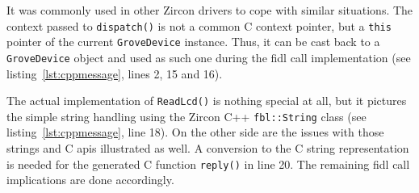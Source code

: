 It was commonly used in other Zircon drivers to cope with similar situations.
%
%
%
The context passed to \texttt{dispatch()} is not a common C context pointer, but a \texttt{this} pointer of the current \texttt{GroveDevice} instance.
Thus, it can be cast back to a \texttt{GroveDevice} object and used as such one during the \ac{fidl} call implementation (see listing~\ref{lst:cppmessage}, lines 2, 15 and 16).

The actual implementation of \texttt{ReadLcd()} is nothing special at all, but it pictures the simple string handling using the Zircon C++ \texttt{fbl::String} class (see listing~\ref{lst:cppmessage}, line 18).
On the other side are the issues with those strings and C \acp{api} illustrated as well.
A conversion to the C string representation is needed for the generated C function \texttt{reply()} in line 20.
The remaining \ac{fidl} call implications are done accordingly.

 
